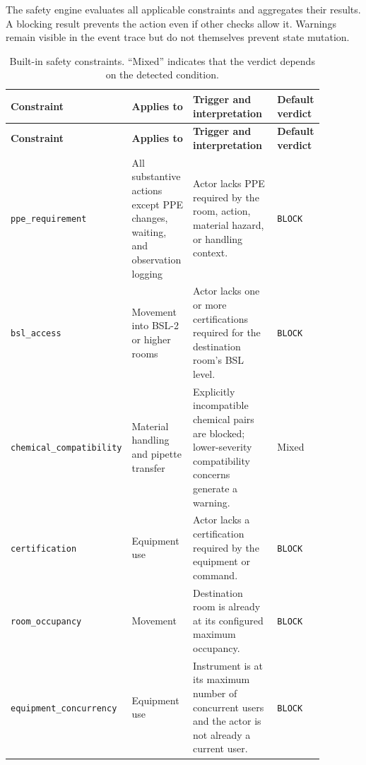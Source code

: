 The safety engine evaluates all applicable constraints and aggregates their
results. A blocking result prevents the action even if other checks allow it.
Warnings remain visible in the event trace but do not themselves prevent state
mutation.

\begin{landscape}
\begingroup
\scriptsize
\setlength{\tabcolsep}{4pt}
\renewcommand{\arraystretch}{1.12}
\begin{longtable}{
    >{\raggedright\arraybackslash}p{0.19\linewidth}
    >{\raggedright\arraybackslash}p{0.23\linewidth}
    >{\raggedright\arraybackslash}p{0.36\linewidth}
    >{\raggedright\arraybackslash}p{0.10\linewidth}
}
\caption{Built-in safety constraints. ``Mixed'' indicates that the verdict
depends on the detected condition.}
\label{tab:safety_constraints}\\
\toprule
\textbf{Constraint} & \textbf{Applies to} & \textbf{Trigger and interpretation}
& \textbf{Default verdict} \\
\midrule
\endfirsthead
\toprule
\textbf{Constraint} & \textbf{Applies to} & \textbf{Trigger and interpretation}
& \textbf{Default verdict} \\
\midrule
\endhead
\bottomrule
\endlastfoot

\texttt{ppe\_requirement} & All substantive actions except PPE changes,
waiting, and observation logging & Actor lacks PPE required by the room,
action, material hazard, or handling context. & \texttt{BLOCK} \\

\texttt{bsl\_access} & Movement into BSL-2 or higher rooms & Actor lacks one
or more certifications required for the destination room's BSL level. &
\texttt{BLOCK} \\

\texttt{chemical\_compatibility} & Material handling and pipette transfer &
Explicitly incompatible chemical pairs are blocked; lower-severity
compatibility concerns generate a warning. & Mixed \\

\texttt{certification} & Equipment use & Actor lacks a certification required
by the equipment or command. & \texttt{BLOCK} \\

\texttt{room\_occupancy} & Movement & Destination room is already at its
configured maximum occupancy. & \texttt{BLOCK} \\

\texttt{equipment\_concurrency} & Equipment use & Instrument is at its maximum
number of concurrent users and the actor is not already a current user. &
\texttt{BLOCK} \\


\end{longtable}
\end{landscape}
